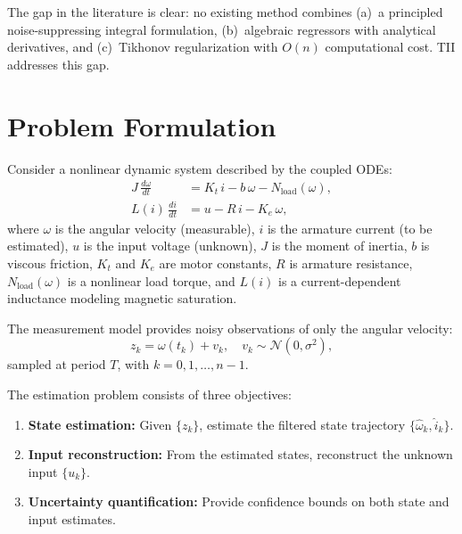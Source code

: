 \documentclass[lettersize,journal]{IEEEtran}
\begin{document}
The gap in the literature is clear: no existing method combines (a)~a principled noise-suppressing integral formulation, (b)~algebraic regressors with analytical derivatives, and (c)~Tikhonov regularization with $O(n)$ computational cost. TII addresses this gap.

\section{Problem Formulation}
\label{sec:problem}

Consider a nonlinear dynamic system described by the coupled ODEs:
\begin{align}
J\,\frac{d\omega}{dt} &= K_t\,i - b\,\omega - N_{\text{load}}(\omega), \label{eq:mech} \\
L(i)\,\frac{di}{dt} &= u - R\,i - K_e\,\omega, \label{eq:elec}
\end{align}
where $\omega$ is the angular velocity (measurable), $i$ is the armature current (to be estimated), $u$ is the input voltage (unknown), $J$ is the moment of inertia, $b$ is viscous friction, $K_t$ and $K_e$ are motor constants, $R$ is armature resistance, $N_{\text{load}}(\omega)$ is a nonlinear load torque, and $L(i)$ is a current-dependent inductance modeling magnetic saturation.

The measurement model provides noisy observations of only the angular velocity:
\begin{equation}
\label{eq:meas}
z_k = \omega(t_k) + v_k, \quad v_k \sim \mathcal{N}(0, \sigma^2),
\end{equation}
sampled at period $T$, with $k = 0, 1, \ldots, n-1$.

The estimation problem consists of three objectives:
\begin{enumerate}
    \item[(O1)] \textbf{State estimation:} Given $\{z_k\}$, estimate the filtered state trajectory $\{\hat{\omega}_k, \hat{i}_k\}$.
    \item[(O2)] \textbf{Input reconstruction:} From the estimated states, reconstruct the unknown input $\{u_k\}$.
    \item[(O3)] \textbf{Uncertainty quantification:} Provide confidence bounds on both state and input estimates.
\end{enumerate}
\end{document}
